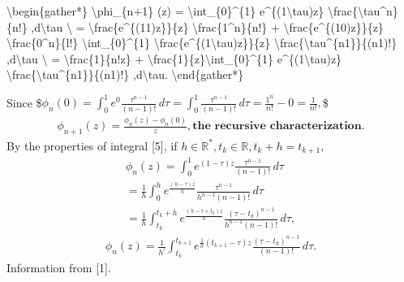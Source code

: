 \documentclass[letterpaper,10pt,english]{jupyterBook}
\begin{document}
\sphinxAtStartPar
\textbackslash{}begin\{gather*\}
\textbackslash{}phi\_\{n+1\} (z) = \textbackslash{}int\_\{0\}\textasciicircum{}\{1\} e\textasciicircum{}\{(1\sphinxhyphen{}\textbackslash{}tau)z\} \textbackslash{}frac\{\textbackslash{}tau\textasciicircum{}n\}\{n!\} ,d\textbackslash{}tau \textbackslash{}
= \sphinxhyphen{} \textbackslash{}frac\{e\textasciicircum{}\{(1\sphinxhyphen{}1)z\}\}\{z\} \textbackslash{}frac\{1\textasciicircum{}n\}\{n!\} + \textbackslash{}frac\{e\textasciicircum{}\{(1\sphinxhyphen{}0)z\}\}\{z\} \textbackslash{}frac\{0\textasciicircum{}n\}\{l!\} \sphinxhyphen{} \textbackslash{}int\_\{0\}\textasciicircum{}\{1\} \sphinxhyphen{}\textbackslash{}frac\{e\textasciicircum{}\{(1\sphinxhyphen{}\textbackslash{}tau)z\}\}\{z\} \textbackslash{}frac\{\textbackslash{}tau\textasciicircum{}\{n\sphinxhyphen{}1\}\}\{(n\sphinxhyphen{}1)!\} ,d\textbackslash{}tau \textbackslash{}
= \sphinxhyphen{} \textbackslash{}frac\{1\}\{n!z\} + \textbackslash{}frac\{1\}\{z\}\textbackslash{}int\_\{0\}\textasciicircum{}\{1\} e\textasciicircum{}\{(1\sphinxhyphen{}\textbackslash{}tau)z\} \textbackslash{}frac\{\textbackslash{}tau\textasciicircum{}\{n\sphinxhyphen{}1\}\}\{(n\sphinxhyphen{}1)!\} ,d\textbackslash{}tau.
\textbackslash{}end\{gather*\}

\sphinxAtStartPar
Since
\$\(
  \phi_n(0) = \int_{0}^{1} e^0 \frac{\tau^{n-1}}{(n-1)!} \,d\tau = \int_{0}^{1} \frac{\tau^{n-1}}{(n-1)!} \,d\tau = \frac{1^n}{n!} - 0 = \frac{1}{n!},
\)\$
\begin{equation*}
\begin{split}
  \phi_{n+1}(z) = \frac{\phi_n(z) - \phi_n(0)}{z}, \textbf{the recursive characterization}.
\end{split}
\end{equation*}
\sphinxAtStartPar
By the properties of integral {[}5{]}, if \(h \in \mathbb{R}^*, t_k \in \mathbb{R}, t_k+h = t_{k+1},\)
\begin{equation*}
\begin{split}
  \phi_n (z) = \int_{0}^{1} e^{(1-\tau)z} \frac{\tau^{n-1}}{(n-1)!} \,d\tau \\
  = \frac{1}{h}\int_{0}^{h} e^{\frac{(h-\tau)z}{h}} \frac{\tau^{n-1}}{h^{n-1}(n-1)!} \,d\tau \\
  = \frac{1}{h}\int_{t_k}^{t_k + h} e^{\frac{(h-\tau+t_k)z}{h}} \frac{(\tau - t_k)^{n-1}}{h^{n-1}(n-1)!} \,d\tau,
\end{split}
\end{equation*}\begin{equation*}
\begin{split}
  \phi_n (z) = \frac{1}{h^l}\int_{t_k}^{t_{k+1}} e^{\frac{1}{h}(t_{k+1}-\tau)z} \frac{(\tau - t_k)^{n-1}}{(n-1)!} \,d\tau.
\end{split}
\end{equation*}
\sphinxAtStartPar
Information from {[}1{]}.
\end{document}
